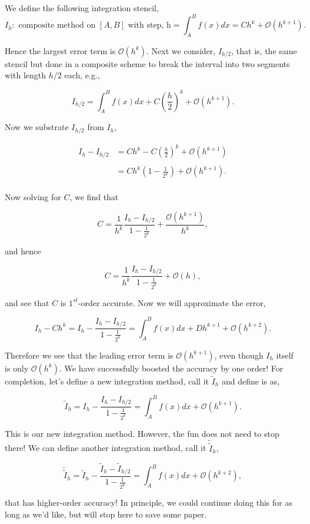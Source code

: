 \documentclass[paper=a4, fontsize=11pt]{scrartcl} %
\numberwithin{equation}{section} %
\numberwithin{figure}{section} %
\numberwithin{table}{section} %
\begin{document}
 We define the following integration stencil, $$I_h: \mbox{ composite method on } [A,B] \mbox{ with step, h} = \int_A^B f(x) dx = C h^k +  \mathcal{O}(h^{k+1}).$$
 
 Hence the largest error term is $\mathcal{O}(h^k)$. Next we consider, $I_{h/2}$, that is, the same stencil but done in a composite scheme to break the interval into two segments with length $h/2$ each, e.g., 
 
 $$I_{h/2} = \int_A^B f(x) dx + C\left( \frac{h}{2} \right)^k +  \mathcal{O}(h^{k+1}).$$
 
 Now we substrate $I_{h/2}$ from $I_h$,
 
 \begin{align*}
 I_h - I_{h/2} &= Ch^k - C\left( \frac{h}{2}  \right)^k +  \mathcal{O}(h^{k+1}) \\ \\
 	&= Ch^k \left( 1 - \frac{1}{2^k}  \right)  +  \mathcal{O}(h^{k+1}). \\
 \end{align*}
 
 Now solving for $C$, we find that 
 
 $$C = \frac{1}{h^k} \frac{ I_h - I_{h/2}   }{ 1 - \frac{1}{2^k}   } + \frac{ \mathcal{O}(h^{k+1})  }{ h^k  },$$
 
 and hence
 
 $$C =  \frac{1}{h^k} \frac{ I_h - I_{h/2}   }{ 1 - \frac{1}{2^k}   }  + \mathcal{O}(h),$$
 
 and see that $C$ is $1^{st}$-order accurate. Now we will approximate the error,
 
 $$I_h - Ch^k = I_h - \frac{  I_h - I_{h/2}   }{ 1 - \frac{1}{2^k}   }   = \int_A^B f(x) dx + D h^{k+1} + \mathcal{O}(h^{k+2}).$$
 
 Therefore we see that the leading error term is $\mathcal{O}(h^{k+1})$, even though $I_h$ itself is only $\mathcal{O}(h^k).$ We have successfully boosted the accuracy by one order! For completion, let's define a new integration method, call it $\tilde{I}_h$ and define is as,
 
 $$\tilde{I}_h = I_h - \frac{  I_h - I_{h/2}   }{ 1 - \frac{1}{2^k}   } = \int_A^B f(x) dx + \mathcal{O}(h^{k+1}).$$
 
 This is our new integration method. However, the fun does not need to stop there! We can define another integration method, call it $\tilde{\tilde{I}}_h$, 
 
 $$\tilde{\tilde{I}}_h = \tilde{I}_h -  \frac{  \tilde{I}_h - \tilde{I}_{h/2}   }{ 1 - \frac{1}{2^k}   } = \int_A^B f(x) dx + \mathcal{O}(h^{k+2}),$$
 
 that has higher-order accuracy! In principle, we could continue doing this for as long as we'd like, but will stop here to save some paper.
 
\end{document}
